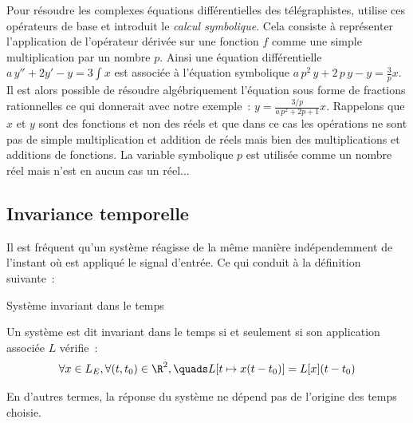 \begin{remarque}
  Pour résoudre les complexes équations différentielles des
  télégraphistes, \Heaviside{} utilise ces opérateurs de base
  et introduit le \emph{calcul symbolique}. Cela consiste à
  représenter l'application de l'opérateur dérivée sur une
  fonction $f$ comme une simple multiplication par un nombre
  $p$. Ainsi une équation différentielle
  $a\,y'' + 2y' -y = 3\int x$ est associée à l'équation
  symbolique $a\,p^2\,y + 2\,p\,y - y = \frac{3}{p}x$. Il est
  alors possible de résoudre algébriquement l'équation sous
  forme de fractions rationnelles ce qui donnerait avec notre
  exemple~: $y = \frac{3/p}{a\,p^2+2p+1} x$. Rappelons que $x$
  et $y$ sont des fonctions et non des réels et que dans ce
  cas les opérations ne sont pas de simple multiplication et
  addition de réels mais bien des multiplications et additions
  de fonctions. La variable symbolique $p$ est utilisée comme
  un nombre réel mais n'est en aucun cas un réel...
\end{remarque}

\subsection{Invariance temporelle}
Il est fréquent qu'un système réagisse de la même manière
indépendemment de l'instant où est appliqué le signal
d'entrée. Ce qui conduit à la définition suivante~:
\begin{definition}{Système invariant dans le temps}
  
  Un système est dit invariant dans le temps si et seulement
  si son application associée $L$ vérifie~:
  \begin{equation}
    \forall x\in L_E, \forall (t,t_0)\in \R^2, \quads L[t\mapsto x(t-t_{0})] = L[x](t-t_{0}) 
  \end{equation}
\end{definition}

En d'autres termes, la réponse du système ne dépend pas de
l'origine des temps choisie.

